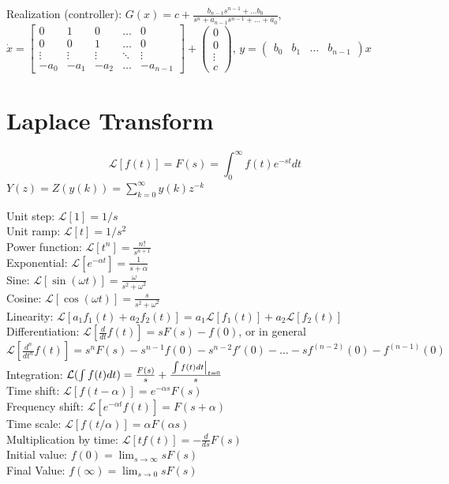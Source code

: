 \documentclass[11pt]{article}
\begin{document}
Realization (controller):
$G(x) = c + \frac{b_{n-1}s^{n-1} + \dots b_0}{s^n + a_{n-1}s^{n-1} + \dots + a_0}$,\\
$\dot{x} = \begin{bmatrix}
    0 & 1 & 0 & \dots & 0 \\
    0 & 0 & 1 & \dots & 0 \\
    \vdots & \vdots & \vdots & \ddots & \vdots \\
    -a_0 & -a_1 & -a_2 & \dots & -a_{n-1}
\end{bmatrix} + \begin{pmatrix}
    0 \\ 0 \\ \vdots \\ c
\end{pmatrix}$, $y = \begin{pmatrix}
    b_0 & b_1 & \dots & b_{n-1}
\end{pmatrix}x$

\section{Laplace Transform}
$$\mathcal{L}[f(t)] = F(s) = \int_{0} ^ \infty f(t) e^{-st} dt $$
$Y(z) = Z(y(k)) = \sum_{k = 0} ^ \infty y(k)z^{-k}$

Unit step: $\mathcal{L}[1] = 1/s$\\
Unit ramp: $\mathcal{L}[t] = 1/s^2$\\
Power function: $\mathcal{L}[t^n] = \frac{n!}{s^{n+1}}$\\
Exponential: $\mathcal{L}[e^{-\alpha t}] = \frac{1}{s + \alpha}$\\
Sine: $\mathcal{L}[\sin(\omega t)] = \frac{\omega}{s^2 + \omega^2}$\\
Cosine: $\mathcal{L}[\cos(\omega t)] = \frac{s}{s^2 + \omega^2}$\\

Linearity: $\mathcal{L}[a_1 f_1(t) + a_2 f_2(t)] = a_1 \mathcal{L}[f_1(t)] + a_2 \mathcal{L}[f_2(t)]$\\
Differentiation: $\mathcal{L}[\frac{d}{dt} f(t)] = sF(s) - f(0)$, or in general
$\mathcal{L}[\frac{d^n}{dt^n} f(t)] = s^nF(s) - s^{n-1}f(0) - s^{n-2}f'(0) - \dots - s f^{(n-2)}(0) - f^{(n-1)}(0)$\\
Integration: $\mathcal{L}(\int f(t)dt) = \frac{F(s)}{s} + \frac{\left.\int f(t)dt\right\rvert_{t=0}^{}}{s}$\\
Time shift: $\mathcal{L}[f(t-\alpha)] = e^{-\alpha s}F(s)$\\
Frequency shift: $\mathcal{L}[e^{-\alpha t}f(t)] = F(s + \alpha)$\\
Time scale: $\mathcal{L}[f(t/\alpha)] = \alpha F (\alpha s)$\\
Multiplication by time: $\mathcal{L}[tf(t)] = - \frac{d}{ds}F(s)$\\
Initial value: $f(0) = \lim_{s\to \infty}sF(s)$\\
Final Value: $f(\infty) = \lim_{s\to 0}s F(s)$
\end{document}
